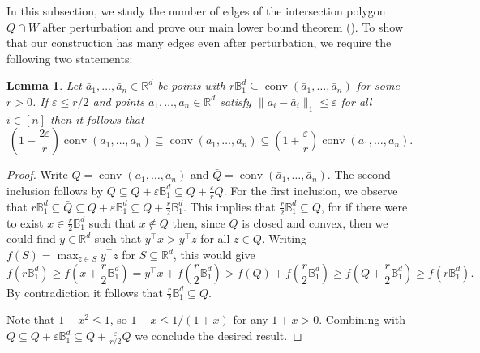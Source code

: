 \documentclass{article}\usepackage[a4paper,margin=20mm]{geometry}
\newtheorem{theorem}{Theorem}\newtheorem{lemma}[theorem]{Lemma}\newtheorem{proposition}[theorem]{Proposition}\newtheorem{corollary}[theorem]{Corollary}\newtheorem{definition}[theorem]{Definition}\newtheorem{claim}[theorem]{Claim}\newtheorem{remark}[theorem]{Remark}\newtheorem{observation}[theorem]{Observation}\newtheorem{conjecture}[theorem]{Conjecture}\newtheorem{example}[theorem]{Example}
\newcommand{\R}{\mathbb R}
\newcommand{\T}{\top}
\newcommand{\eps}{\varepsilon} %
\newcommand{\conv}{\operatorname{conv}}
\newcommand{\edges}{\operatorname{edges}}
\renewcommand{\subset}{\subseteq}
\begin{document}
In this subsection, we study the number of edges of the intersection polygon $Q \cap W$ after perturbation and prove our main lower bound theorem (). 
To show that our construction has many edges even after perturbation,
we require the following two statements:
\begin{lemma}\label{lem:hdist}
Let $\bar a_1,\dots,\bar a_n \in \R^d$ be points with
$r \mathbb B ^d_1 \subseteq \conv(\bar a_1,\dots,\bar a_n)$ for some $r > 0$.
If $\eps \leq r/2$ and points $a_1,\dots, a_n \in \R^d$ satisfy $\|a_i - \bar a_i\|_1 \leq \eps$
for all $i \in [n]$ then it follows that
\[
(1-\frac{2 \eps}{r}) \conv(\bar a_1,\dots,\bar a_n) \subseteq \conv(a_1,\dots,a_n)
\subseteq (1+\frac{\eps}{r}) \conv(\bar a_1,\dots,\bar a_n).
\]
\end{lemma}
\begin{proof}
Write $Q = \conv(a_1,\dots,a_n)$ and $\bar Q = \conv(\bar a_1,\dots,\bar a_n)$.
The second inclusion follows by $Q \subseteq \bar Q + \eps \mathbb B_1^d \subseteq \bar Q + \frac{\eps}{r}\bar Q$.
For the first inclusion, we observe that
$r \mathbb B_1^d \subseteq \bar Q \subseteq Q + \eps \mathbb B_1^d \subseteq Q + \frac{r}{2} \mathbb B_1^d$.
This implies that $\frac r 2 \mathbb B_1^d \subseteq Q$, for
if there were to exist $x \in \frac r 2 \mathbb B^d_1$ such that $x \notin Q$ then,
since $Q$ is closed and convex, then we could find $y \in \R^d$ such that
$y^\T x > y^\T z$ for all $z \in Q$. Writing $f(S) = \max_{z \in S} y^\T z$
for $S \subseteq \R^d$, this would give
\[
f(r\mathbb B_1^d) \geq f(x + \frac r 2 \mathbb B_1^d)
= y^\T x + f(\frac r 2 \mathbb B_1^d)
> f(Q) + f(\frac r 2 \mathbb B_1^d)
\geq f(Q + \frac r 2 \mathbb B_1^d)
\geq f(r \mathbb B_1^d).
\]
By contradiction it follows that $\frac r 2 \mathbb B_1^d \subseteq Q$.

Note that $1-x^{2} \leq 1$, so $1-x \leq 1/(1+x)$ for any $1+x > 0$. Combining with $\bar Q \subseteq Q + \eps\mathbb B_1^d \subseteq Q + \frac{\eps}{r/2} Q$ we conclude the desired result.
\end{proof}
\end{document}
